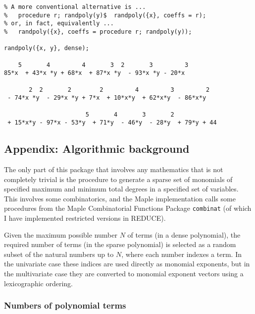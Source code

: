 \begin{verbatim}
% A more conventional alternative is ...
%   procedure r; randpoly(y)$  randpoly({x}, coeffs = r);
% or, in fact, equivalently ...
%   randpoly({x}, coeffs = procedure r; randpoly(y));

randpoly({x, y}, dense);

    5       4         4       3  2       3         3
85*x  + 43*x *y + 68*x  + 87*x *y  - 93*x *y - 20*x

       2  2       2        2         4         3         2
 - 74*x *y  - 29*x *y + 7*x  + 10*x*y  + 62*x*y  - 86*x*y

                       5       4       3       2
 + 15*x*y - 97*x - 53*y  + 71*y  - 46*y  - 28*y  + 79*y + 44
\end{verbatim}




\newtheorem{prop}{Proposition}

\newenvironment{randpproof}%
   {\par\addvspace\baselineskip\noindent{\bf Proof~}}%
   {\hspace*{\fill}$\Box$\par\addvspace\baselineskip}

\subsection{Appendix: Algorithmic background}

The only part of this package that involves any mathematics that is
not completely trivial is the procedure to generate a sparse set of
monomials of specified maximum and minimum total degrees in a
specified set of variables.  This involves some combinatorics, and the
Maple implementation calls some procedures from the Maple
Combinatorial Functions Package {\tt combinat} (of which I have
implemented restricted versions in REDUCE).

Given the maximum possible number $N$ of terms (in a dense
polynomial), the required number of terms (in the sparse polynomial)
is selected as a random subset of the natural numbers up to $N$, where
each number indexes a term.  In the univariate case these indices are
used directly as monomial exponents, but in the multivariate case they
are converted to monomial exponent vectors using a lexicographic
ordering.


\subsubsection{Numbers of polynomial terms}

